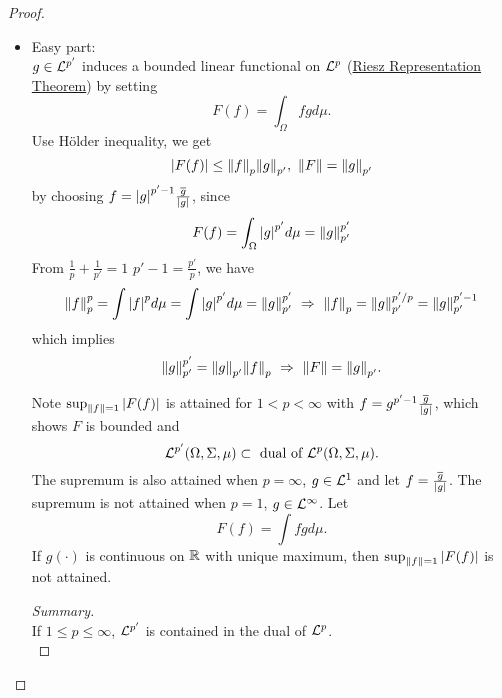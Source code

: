 \begin{proof}\
\begin{itemize}
    \item Easy part:\\
    $g \in \mathcal{L}^{p'}$ induces a bounded linear functional on $\mathcal{L}^p$ (\hyperref[RRT]{Riesz Representation Theorem}) by setting 
    \begin{equation*}
        F(f) = \int_\Omega fg d\mu.
    \end{equation*} 
    Use H\"older inequality, we get
    \begin{equation*}
        \abs{F(f)} \leq \norm{f}_p \norm{g}_{p'},\ \norm{F} = \norm{g}_{p'}    
    \end{equation*} 
    by choosing $f = \abs{g}^{p' - 1} \frac{\overline{g}}{\abs{g}}$, since 
    \begin{equation*}
        F(f) = \int_\Omega \abs{g}^{p'} d\mu = \norm{g}_{p'}^{p'}
    \end{equation*}
    From $\frac{1}{p} + \frac{1}{p'} = 1$ \imply $p' - 1 = \frac{p'}{p}$, we have 
    \begin{equation*}
        \norm{f}_{p}^p = \int \abs{f}^p d\mu = \int \abs{g}^{p'} d\mu = \norm{g}_{p'}^{p'}\ \Rightarrow\ \norm{f}_p = \norm{g}_{p'}^{p'/p} = \norm{g}_{p'}^{p' - 1}
    \end{equation*}
    which implies
    \begin{equation*}
      \norm{g}_{p'}^{p'} = \norm{g}_{p'} \norm{f}_p\ \Rightarrow\ \norm{F} = \norm{g}_{p'}.  
    \end{equation*}
    \begin{remark}
    Note $\sup_{\norm{f} = 1} \abs{F(f)}$ is attained for $1 < p < \infty$ with $f = g^{p'-1} \frac{\overline{g}}{\abs{g}}$, which shows $F$ is bounded and 
    $$\mathcal{L}^{p'}(\Omega,\Sigma, \mu) \subset \text{ dual of } \mathcal{L}^p(\Omega, \Sigma, \mu).$$ The supremum is also attained when $p = \infty$, $g \in \mathcal{L}^1$ and let $f = \frac{\overline{g}}{\abs{g}}$. The supremum is not attained when $p = 1$, $g \in \mathcal{L}^\infty$. Let 
    \begin{equation*}
        F(f) = \int fg d\mu.
    \end{equation*}
    If $g(\cdot)$ is continuous on $\mathbb{R}$ with unique maximum, then $\sup_{\norm{f} = 1} \abs{F(f)}$ is not attained.  
    \end{remark}
    \begin{proof}[Summary]\ \\
    If $1 \leq p \leq \infty$, $\mathcal{L}^{p'}$ is contained in the dual of $\mathcal{L}^p$.\\ 

\end{proof}
\end{itemize}
\end{proof}
